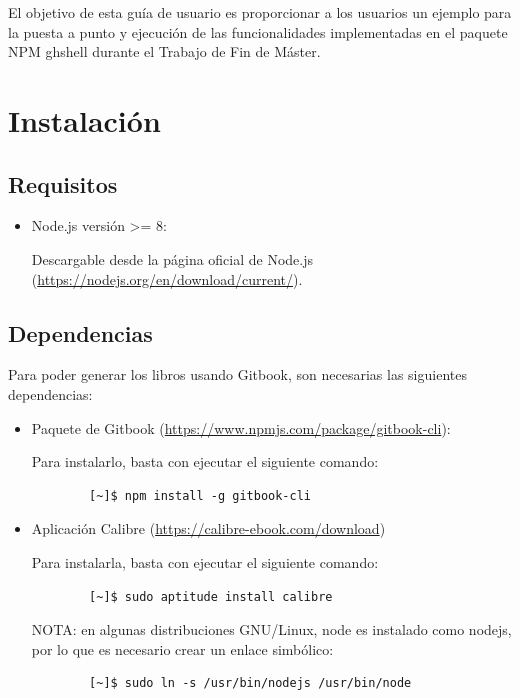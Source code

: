El objetivo de esta guía de usuario es proporcionar a los usuarios un ejemplo para la puesta a punto y ejecución de las 
funcionalidades implementadas en el paquete NPM ghshell durante el Trabajo de Fin de Máster.

\section{Instalación}
\label{Apendice2:instalacion}

\subsection{Requisitos}
\label{subsec:b.1.1}

\begin{itemize}
	\item Node.js versión \textgreater = 8:
	
	Descargable desde la página oficial de Node.js (\url{https://nodejs.org/en/download/current/}).
	
\end{itemize}

\subsection{Dependencias}
\label{subsec:b.1.2}

Para poder generar los libros usando Gitbook, son necesarias las siguientes dependencias:

\begin{itemize}
	\item Paquete de Gitbook (\url{https://www.npmjs.com/package/gitbook-cli}):
	
	Para instalarlo, basta con ejecutar el siguiente comando:
	
	\begin{verbatim}
		[~]$ npm install -g gitbook-cli
	\end{verbatim}

	\item Aplicación Calibre (\url{https://calibre-ebook.com/download})
	
	Para instalarla, basta con ejecutar el siguiente comando:
	
	\begin{verbatim}
		[~]$ sudo aptitude install calibre
	\end{verbatim}
	
	NOTA: en algunas distribuciones GNU/Linux, node es instalado como nodejs, por lo que es necesario crear un enlace simbólico:
	
	\begin{verbatim}
		[~]$ sudo ln -s /usr/bin/nodejs /usr/bin/node
	\end{verbatim}
	
\end{itemize}

